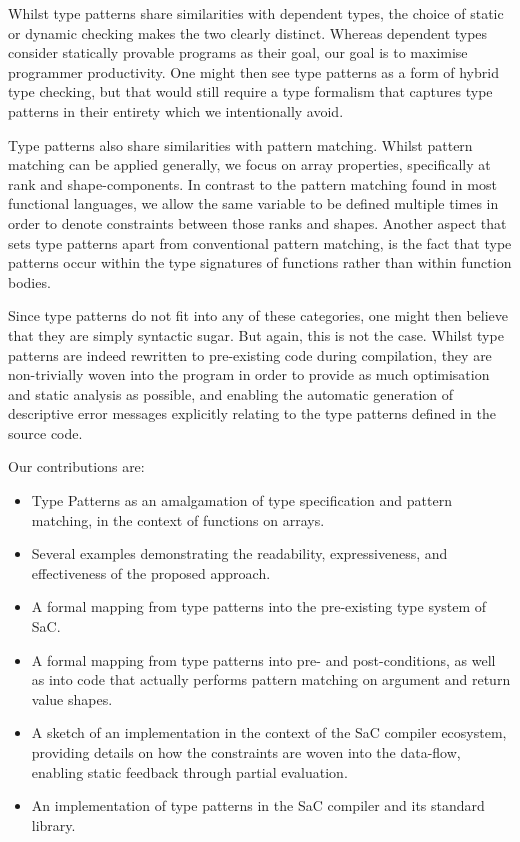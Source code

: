 \documentclass[sigconf,screen]{acmart}
\begin{document}
Whilst type patterns share similarities with dependent types, the choice of static or dynamic checking makes the two clearly distinct.
Whereas dependent types consider statically provable programs as their goal, our goal is to maximise programmer productivity.
One might then see type patterns as a form of hybrid type checking, but that would still require a type formalism that captures type patterns in their entirety which we intentionally avoid.

Type patterns also share similarities with pattern matching.
Whilst pattern matching can be applied generally, we focus on array properties, specifically at rank and shape-components.
In contrast to the pattern matching found in most functional languages, we allow the same variable to be defined multiple times in order to denote constraints between those ranks and shapes.
Another aspect that sets type patterns apart from conventional pattern matching, is the fact that type patterns occur within the type signatures of functions rather than within function bodies.

Since type patterns do not fit into any of these categories, one might then believe that they are simply syntactic sugar.
But again, this is not the case.
Whilst type patterns are indeed rewritten to pre-existing code during compilation, they are non-trivially woven into the program in order to provide as much optimisation and static analysis as possible, and enabling the automatic generation of descriptive error messages explicitly relating to the type patterns defined in the source code.

Our contributions are:
\begin{itemize}
  \item Type Patterns as an amalgamation of type specification and pattern matching, in the context of functions on arrays.
  \item Several examples demonstrating the readability, expressiveness, and effectiveness of the proposed approach.
  \item A formal mapping from type patterns into the pre-existing type system of SaC.
  \item A formal mapping from type patterns into pre- and post-conditions, as well as into code that actually performs pattern matching on argument and return value shapes.
  \item A sketch of an implementation in the context of the SaC compiler ecosystem, providing details on how the constraints are woven into the data-flow, enabling static feedback through partial evaluation.
  \item An implementation of type patterns in the SaC compiler and its standard library.
\end{itemize}
\end{document}
